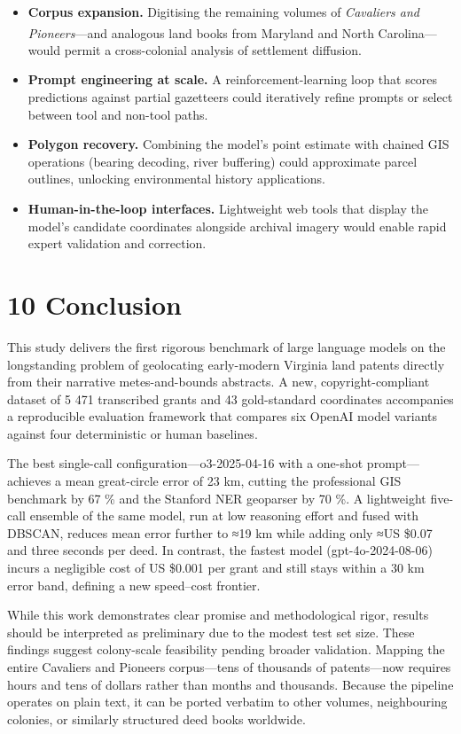 \documentclass[
  10pt]{article}
\providecommand{\tightlist}{%
  \setlength{\itemsep}{0pt}\setlength{\parskip}{0pt}}
\begin{document}
\begin{itemize}
\tightlist
\item
  \textbf{Corpus expansion.} Digitising the remaining volumes of
  \emph{Cavaliers and
  Pioneers}\textsuperscript{}---and
  analogous land books from Maryland and North Carolina---would permit a
  cross-colonial analysis of settlement diffusion.
\item
  \textbf{Prompt engineering at scale.} A reinforcement-learning loop
  that scores predictions against partial gazetteers could iteratively
  refine prompts or select between tool and non-tool paths.
\item
  \textbf{Polygon recovery.} Combining the model's point estimate with
  chained GIS operations (bearing decoding, river buffering) could
  approximate parcel outlines, unlocking environmental history
  applications.
\item
  \textbf{Human-in-the-loop interfaces.} Lightweight web tools that
  display the model's candidate coordinates alongside archival imagery
  would enable rapid expert validation and correction.
\end{itemize}

\section{10 Conclusion}\label{conclusion}

This study delivers the first rigorous benchmark of large language
models on the longstanding problem of geolocating early-modern Virginia
land patents directly from their narrative metes-and-bounds abstracts. A
new, copyright-compliant dataset of 5 471 transcribed grants and 43
gold-standard coordinates accompanies a reproducible evaluation
framework that compares six OpenAI model variants against four
deterministic or human baselines.

The best single-call configuration---o3-2025-04-16 with a one-shot
prompt---achieves a mean great-circle error of 23 km, cutting the
professional GIS benchmark by 67 \% and the Stanford NER geoparser by 70
\%. A lightweight five-call ensemble of the same model, run at low
reasoning effort and fused with DBSCAN, reduces mean error further to
≈19 km while adding only ≈US \$0.07 and three seconds per deed. In
contrast, the fastest model (gpt-4o-2024-08-06) incurs a negligible cost
of US \$0.001 per grant and still stays within a 30 km error band,
defining a new speed--cost frontier.

While this work demonstrates clear promise and methodological rigor,
results should be interpreted as preliminary due to the modest test set
size. These findings suggest colony-scale feasibility pending broader
validation. Mapping the entire Cavaliers and Pioneers corpus---tens of
thousands of patents---now requires hours and tens of dollars rather
than months and thousands. Because the pipeline operates on plain text,
it can be ported verbatim to other volumes, neighbouring colonies, or
similarly structured deed books worldwide.
\end{document}
